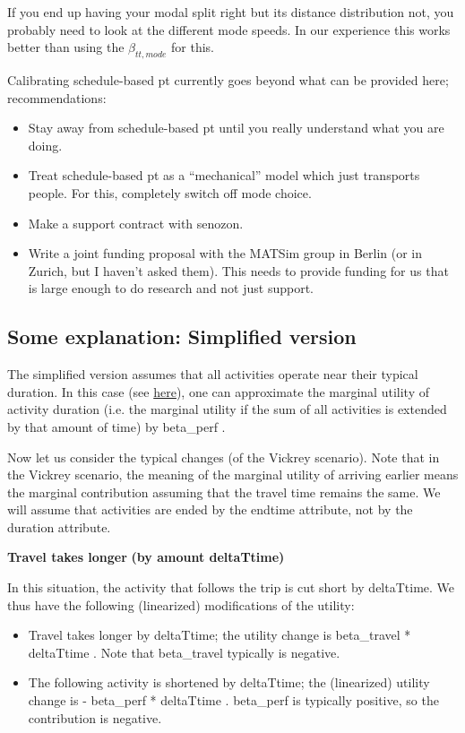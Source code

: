 If you end up having your modal split right but its distance distribution not, you probably need to look at the different mode speeds.  In our experience this works better than using the $\beta_{tt,mode}$ for this.

Calibrating schedule-based pt currently goes beyond what can be provided here; recommendations:
\begin{itemize}

\item Stay away from schedule-based pt until you really understand what you are doing.

\item Treat schedule-based pt as a ``mechanical'' model which just transports people.  For this, completely switch off mode choice.

\item Make a support contract with senozon.

\item Write a joint funding proposal with the MATSim group in Berlin (or in Zurich, but I haven't asked them).  This needs to provide funding for us that is large enough to do research and not just support.

\end{itemize}

\subsection{Some explanation: Simplified version}

The simplified version assumes that all activities operate near their typical duration. In this case (see \href{http://matsim.org/node/651}{here}),  one can approximate the marginal utility of activity duration (i.e. the  marginal utility if the sum of all activities is extended by that  amount of time) by beta\_perf .

Now let us consider the typical changes (of the Vickrey  scenario). Note that in the Vickrey scenario, the meaning of the  marginal utility of arriving earlier means the marginal contribution  assuming that the travel time remains the same. We will assume  that activities are ended by the endtime attribute, not by the duration  attribute.

\textbf{Travel takes longer}\textbf{ (by amount deltaTtime)}

In this situation, the activity that follows the trip is cut short by  deltaTtime. We thus have the following (linearized) modifications  of the utility:
\begin{itemize}
	\item Travel takes longer by deltaTtime; the utility change is  beta\_travel * deltaTtime . Note that beta\_travel typically is  negative.
	\item The following activity is shortened by deltaTtime; the (linearized)  utility change is - beta\_perf * deltaTtime . beta\_perf is  typically positive, so the contribution is negative.
\end{itemize}

